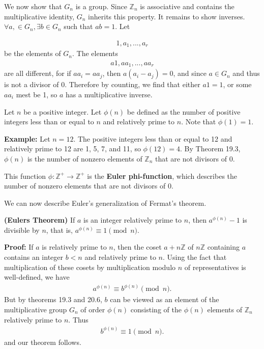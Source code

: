 \documentclass[11pt]{article}
\begin{document}
We now show that $G_n$ is a group. Since $\mathbb{Z}_n$ is associative and contains the multiplicative identity, $G_n$ inherits this property. 
It remains to show inverses. $\forall a, \in G_n, \exists b \in G_n$ such that $ab = 1$. Let 

\begin{align*}
    1, a_1, ..., a_r
\end{align*}
be the elements of $G_n$. The elements 
\begin{align*}
    a1, aa_1, ..., aa_r
\end{align*}
are all different, for if $aa_i = aa_j$, then $a(a_i - a_j) = 0$, and since $a \in G_n$ and thus is not a divisor of 0. 
Therefore by counting, we find that either $a1 = 1$, or some $aa_i$ mest be 1, so $a$ has a multiplicative inverse.

Let $n$ be a positive integer. Let $\phi(n)$ be defined as the number of positive integers less than or equal to $n$ and relatively prime to $n$. Note that $\phi(1) = 1$.

\textbf{Example: } Let $n = 12$. The positive integers less than or equal to 12 and relatively prime to 12 are 1, 5, 7, and 11, so $\phi(12) = 4$. By Theorem 19.3, $\phi(n)$ is the number of nonzero elements of $\mathbb{Z}_n$ that are not divisors of 0.

\begin{definition}
    This function $\phi: \mathbb{Z}^+ \rightarrow \mathbb{Z}^+$ is the \textbf{Euler phi-function}, which describes the number of nonzero elements that are not divisors of 0.
\end{definition}
We can now describe Euler's generalization of Fermat's theorem.
\begin{theorem}
    \textbf{(Eulers Theorem)} If $a$ is an integer relatively prime to $n$, then $a^{\phi(n)} - 1$ is divisible by $n$, that is, $a^{\phi(n)} \equiv 1 \pmod{n}$.
\end{theorem}
\textbf{Proof: } 
If $a$ is relatively prime to $n$, then the coset $a + n\mathbb{Z}$ of $n\mathbb{Z}$ containing $a$ contains an integer $b < n$ and relatively prime to $n$. Using the fact that multiplication of these cosets by multiplication modulo $n$ of representatives is well-defined, we have 
\begin{align*}
    a^{\phi(n)} \equiv b^{\phi(n)} \pmod{n}.
\end{align*}
But by theorems 19.3 and 20.6, $b$ can be viewed as an element of the multiplicative group $G_n$ of order $\phi(n)$ consisting of the $\phi(n)$ elements of $\mathbb{Z}_n$ relatively prime to $n$. Thus 
\begin{align*}
    b^{\phi(n)} \equiv 1 \pmod{n}.
\end{align*}
and our theorem follows.
\end{document}
